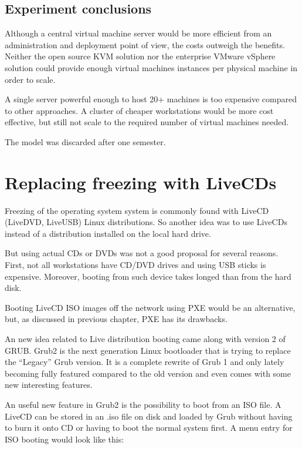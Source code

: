 \subsection{Experiment conclusions}

Although a central virtual machine server would be more efficient from
an administration and deployment point of view, the costs outweigh the
benefits. Neither the open source KVM solution nor the enterprise VMware
vSphere solution could provide enough virtual machines instances per
physical machine in order to scale.

A single server powerful enough to host 20+ machines is too expensive
compared to other approaches. A cluster of cheaper workstations would be
more cost effective, but still not scale to the required number of
virtual machines needed.

The model was discarded after one semester.


\section{Replacing freezing with LiveCDs}


Freezing of the operating system system is commonly found with LiveCD
(LiveDVD, LiveUSB) Linux distributions. So another idea was to use
LiveCDs instead of a distribution installed on the local hard drive.

But using actual CDs or DVDs was not a good proposal for several
reasons. First, not all workstations have CD/DVD drives and using
\ac{USB} sticks is expensive. Moreover, booting from such device takes
longed than from the hard disk.

Booting LiveCD ISO images off the network using \ac{PXE} would be an
alternative, but, as discussed in previous chapter, PXE has its
drawbacks.

An new idea related to Live distribution booting came along with version
2 of \ac{GRUB}. Grub2 is the next generation Linux bootloader that is
trying to replace the “Legacy” Grub version. It is a complete rewrite of
Grub 1 and only lately becoming fully featured compared to the old
version and even comes with some new interesting features.


An useful new feature in Grub2 is the possibility to boot from an ISO
file. A LiveCD can be stored in an .iso file on disk and loaded by
Grub without having to burn it onto CD or having to boot the normal
system first. A menu entry for ISO booting would look like this:


